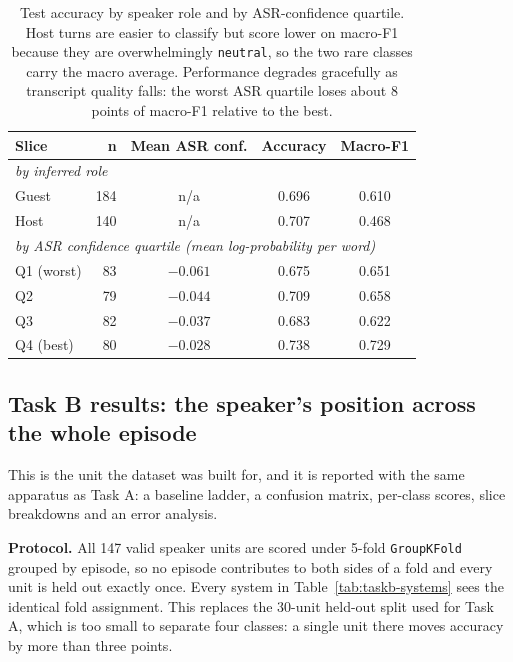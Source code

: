 \documentclass[11pt,a4paper]{article}
\newcommand{\thd}[1]{\textbf{\sffamily\small #1}}          %
\begin{document}
\begin{table}[htbp]\centering
\caption{Test accuracy by speaker role and by ASR-confidence quartile. Host turns are easier to
classify but score lower on macro-F1 because they are overwhelmingly \texttt{neutral}, so the two
rare classes carry the macro average. Performance degrades gracefully as transcript quality falls:
the worst ASR quartile loses about 8 points of macro-F1 relative to the best.}
\begin{tabular}{|l|r|c|c|c|}
\hline
\thd{Slice} & \thd{n} & \thd{Mean ASR conf.} & \thd{Accuracy} & \thd{Macro-F1} \\ \hline
\multicolumn{5}{|l|}{\textit{by inferred role}} \\ \hline
Guest & 184 & n/a & 0.696 & 0.610 \\ \hline
Host  & 140 & n/a & 0.707 & 0.468 \\ \hline
\multicolumn{5}{|l|}{\textit{by ASR confidence quartile (mean log-probability per word)}} \\ \hline
Q1 (worst) & 83 & $-0.061$ & 0.675 & 0.651 \\ \hline
Q2         & 79 & $-0.044$ & 0.709 & 0.658 \\ \hline
Q3         & 82 & $-0.037$ & 0.683 & 0.622 \\ \hline
Q4 (best)  & 80 & $-0.028$ & 0.738 & 0.729 \\ \hline
\end{tabular}
\end{table}

\subsection{Task B results: the speaker's position across the whole episode}

This is the unit the dataset was built for, and it is reported with the same apparatus as Task A:
a baseline ladder, a confusion matrix, per-class scores, slice breakdowns and an error analysis.

\vspace{2pt}
\textbf{Protocol.} All 147 valid speaker units are scored under 5-fold \texttt{GroupKFold}
grouped by episode, so no episode contributes to both sides of a fold and every unit is held out
exactly once. Every system in Table~\ref{tab:taskb-systems} sees the identical fold assignment. This replaces the
30-unit held-out split used for Task A, which is too small to separate four classes: a single
unit there moves accuracy by more than three points.
\end{document}
